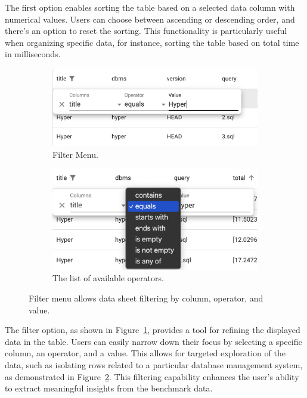 The first option enables sorting the table based on a selected data column with numerical values. Users can choose between ascending or descending order, and there's an option to reset the sorting. This functionality is particularly useful when organizing specific data, for instance, sorting the table based on total time in milliseconds.

\begin{figure}[h]
  \centering
  \begin{subfigure}[b]{0.4\linewidth}
      \includegraphics[width=\linewidth]{figures/data-viewer-filter.png}
      \caption{Filter Menu.}
      \label{fig:data-viewer-filter}
  \end{subfigure}
  \hspace{1cm} %
  \begin{subfigure}[b]{0.4\linewidth}
      \includegraphics[width=\linewidth]{figures/data-viewer-filter-operator.png}
      \caption{The list of available operators.}
      \label{fig:data-viewer-filter-operator}
  \end{subfigure}
  \caption{Filter menu allows data sheet filtering by column, operator, and value.}
  \label{fig:combined-figures}
\end{figure}

The filter option, as shown in Figure~\ref{fig:data-viewer-filter}, provides a tool for refining the displayed data in the table. Users can easily narrow down their focus by selecting a specific column, an operator, and a value. This allows for targeted exploration of the data, such as isolating rows related to a particular database management system, as demonstrated in Figure~\ref{fig:data-viewer-filter-operator}. This filtering capability enhances the user's ability to extract meaningful insights from the benchmark data.


